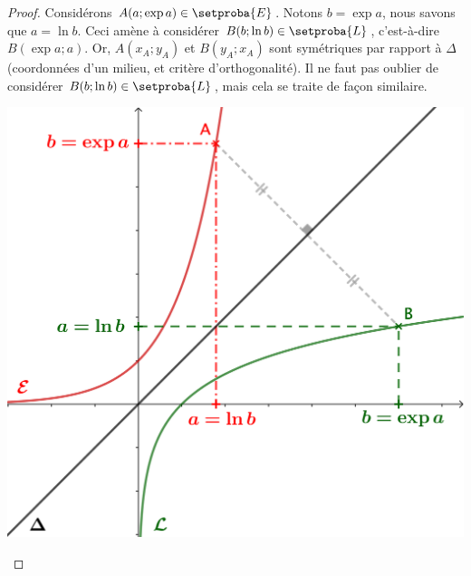 \begin{proof}
	Considérons $A(a;\exp a) \in \setproba{E}$.
	Notons $b = \exp a$, nous savons que $a = \ln b$.
	Ceci amène à considérer $B(b;\ln b) \in \setproba{L}$,
	c'est-à-dire $B(\exp a;a)$.
	Or,
	$A(x_A;y_A)$ et $B(y_A;x_A)$ sont symétriques par rapport à $\Delta$ (coordonnées d'un milieu, et critère d'orthogonalité).
	Il ne faut pas oublier de considérer $B(b;\ln b) \in \setproba{L}$, mais cela se traite de façon similaire.


	\begin{center}
		\includegraphics[scale=.85]{content/exp/graph.png}
	\end{center}
\end{proof}
